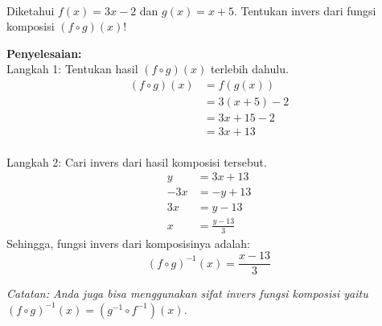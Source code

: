\begin{example}
  \hfill \\
  Diketahui $f(x) = 3x - 2$ dan $g(x) = x + 5$. Tentukan invers dari fungsi komposisi $(f \circ g)(x)$!
  
  \textbf{Penyelesaian:}
  \\ Langkah 1: Tentukan hasil $(f \circ g)(x)$ terlebih dahulu.
  \[\begin{aligned}     (f \circ g)(x) &= f(g(x)) \\                    &= 3(x + 5) - 2 \\                    &= 3x + 15 - 2 \\                    &= 3x + 13   \end{aligned}\]
  \\ Langkah 2: Cari invers dari hasil komposisi tersebut.
  \[\begin{aligned}     y &= 3x + 13 \\     -3x &= -y + 13 \\     3x &= y - 13 \\     x &= \frac{y - 13}{3}   \end{aligned}\]
  Sehingga, fungsi invers dari komposisinya adalah:
  \[(f \circ g)^{-1}(x) = \frac{x - 13}{3}\]
  
  \textit{Catatan: Anda juga bisa menggunakan sifat invers fungsi komposisi yaitu $(f \circ g)^{-1}(x) = (g^{-1} \circ f^{-1})(x)$.}
\end{example}
